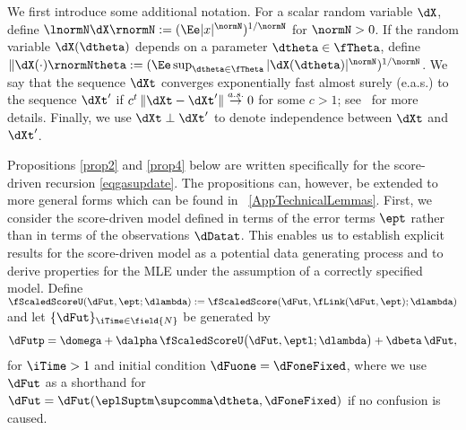We first introduce some additional notation.
For a scalar random variable $\dX$,
define $\lnormN \dX \rnormN := (\Ee|x|^\normN)^{1/\normN}$ for $\normN > 0$.
If the random variable $\dX(\dtheta)$ depends on a parameter $\dtheta \in \fTheta$,  define 
$\| \dX(\cdot) \rnormNtheta := ( \Ee \sup_{\dtheta \in \fTheta} |\dX(\dtheta)|^{\normN} )^{1/\normN}$.
We say that the sequence $\dXt$ converges exponentially fast almost surely (e.a.s.) to the sequence $\dXt'$ if $c^t\,\|\dXt - \dXt'\| \stackrel{a.s.}{\to} 0$ for some $c>1$; see \cite{smikosch2006}\ for more details.
Finally, we use $\dXt \perp \dXt'$ to denote independence between $\dXt$ and $\dXt'$.


Propositions \ref{prop2} and \ref{prop4} below are written specifically for the score-driven recursion \eqref{eqgasupdate}. 
The propositions can, however, be extended to more general forms which can be found in \SupplementaryAppendix~\ref{AppTechnicalLemmas}. 
First, we consider the score-driven model defined in terms of the error terms $\ept$ rather than in terms of the observations $\dDatat$.
This enables us to establish explicit results for the score-driven model as a potential data generating process and  to derive properties for the MLE under the assumption of a correctly specified model.
Define 
$\fScaledScoreU(\dFut,\ept;\dlambda) := \fScaledScore (\dFut,\fLink(\dFut,\ept);\dlambda)$ and let  
$\{ \dFut \}_{\iTime \in \field{N}}$ be generated by
\begin{equation} \label{NRpg10}
    \dFutp = 
    \domega + 
    \dalpha\, \fScaledScoreU \big(\dFut,\eptl ; \dlambda  \big) + 
    \dbeta\, \dFut ,
\end{equation}
for $\iTime>1$ and initial condition $\dFuone = \dFoneFixed$, where we use $\dFut$ as a shorthand for $\dFut = \dFut(\eplSuptm\supcomma\dtheta,\dFoneFixed)$ if no confusion is caused.

